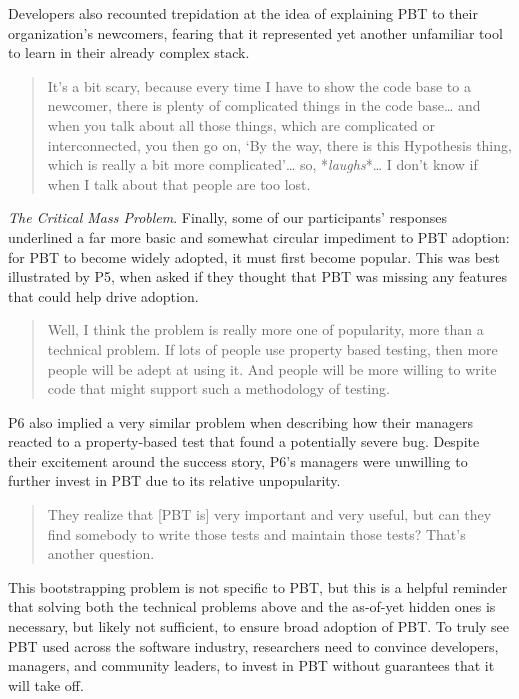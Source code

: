 Developers also recounted trepidation at the idea of explaining PBT to
their organization's newcomers, fearing that it represented yet another unfamiliar
tool to learn in their already complex stack.
\begin{quote}
It's a bit scary, because every time I have to show the code base to a newcomer,
there is plenty of complicated things in the code base\ldots{} and when you
talk about all those things, which are complicated or interconnected, you
then go on, `By the way, there is this Hypothesis thing, which is really
a bit more complicated'\ldots{} so, *\emph{laughs}*\ldots{} I don't know if
when I talk about that people are too lost.
\end{quote}

\textit{The Critical Mass Problem}.
Finally, some of our participants' responses underlined a far more basic and
somewhat circular impediment to PBT adoption: for PBT to become widely adopted, it
must first become popular. This was best illustrated by P5,
when asked if they thought that PBT was missing any features that could help
drive adoption.
\begin{quote}
  Well, I think the problem is really more one of popularity, more than a
  technical problem. If lots of people use property based testing, then more
  people will be adept at using it.  And people will be more willing to write
  code that might support such a methodology of testing.
\end{quote}

P6 also implied a very similar problem when describing
how their managers reacted to a property-based test that found a potentially
severe bug. Despite their excitement around the success story, P6's
managers were unwilling to further invest in PBT due to its relative
unpopularity.
\begin{quote}
  They realize that [PBT is] very important and very useful, but can they find
  somebody to write those tests and maintain those tests? That's another
  question.
\end{quote}

This bootstrapping problem is not specific to PBT, but this is a helpful
reminder that solving both the
technical problems above and the as-of-yet hidden ones is necessary, but
likely not sufficient, to ensure broad adoption of PBT. To truly see PBT used across the software
industry, researchers need to convince developers, managers, and community
leaders, to invest in PBT without guarantees that it will take off.

